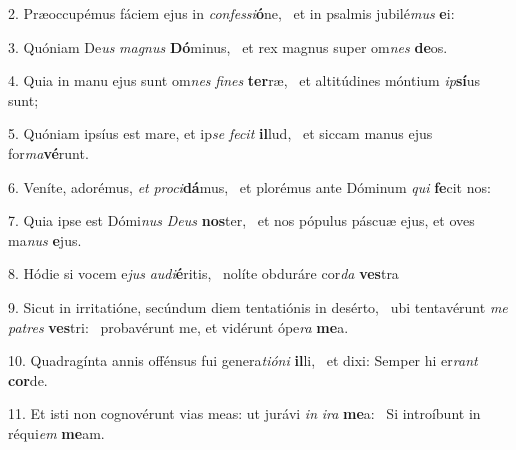 2. Præoccupémus fáciem ejus in \textit{con}\textit{fes}\textit{si}\textbf{ó}ne, \ast\  et in psalmis jubilé\textit{mus} \textbf{e}i:\

3. Quóniam De\textit{us} \textit{ma}\textit{gnus} \textbf{Dó}minus, \ast\  et rex magnus super om\textit{nes} \textbf{de}os.\

4. Quia in manu ejus sunt om\textit{nes} \textit{fi}\textit{nes} \textbf{ter}ræ, \ast\  et altitúdines móntium \textit{ip}\textbf{sí}us sunt;\

5. Quóniam ipsíus est mare, et ip\textit{se} \textit{fe}\textit{cit} \textbf{il}lud, \ast\  et siccam manus ejus for\textit{ma}\textbf{vé}runt.\

6. Veníte, adorémus, \textit{et} \textit{pro}\textit{ci}\textbf{dá}mus, \ast\  et plorémus ante Dóminum \textit{qui} \textbf{fe}cit nos:\

7. Quia ipse est Dómi\textit{nus} \textit{De}\textit{us} \textbf{nos}ter, \ast\  et nos pópulus páscuæ ejus, et oves ma\textit{nus} \textbf{e}jus.\

8. Hódie si vocem e\textit{jus} \textit{au}\textit{di}\textbf{é}ritis, \ast\  nolíte obduráre cor\textit{da} \textbf{ves}tra\

9. Sicut in irritatióne, secúndum diem tentatiónis in desérto, \dag\  ubi tentavérunt \textit{me} \textit{pa}\textit{tres} \textbf{ves}tri: \ast\  probavérunt me, et vidérunt ópe\textit{ra} \textbf{me}a.\

10. Quadragínta annis offénsus fui genera\textit{ti}\textit{ó}\textit{ni} \textbf{il}li, \ast\  et dixi: Semper hi er\textit{rant} \textbf{cor}de.\

11. Et isti non cognovérunt vias meas: ut jurávi \textit{in} \textit{i}\textit{ra} \textbf{me}a: \ast\  Si introíbunt in réqui\textit{em} \textbf{me}am.\


